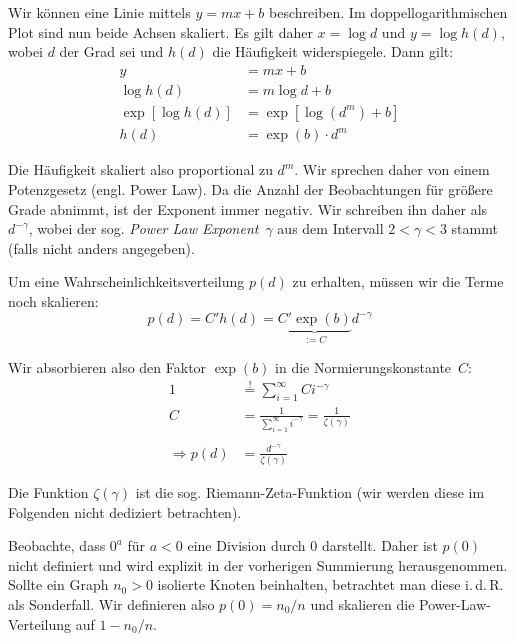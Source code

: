 Wir können eine Linie mittels $y = mx + b$ beschreiben.
Im doppellogarithmischen Plot sind nun beide Achsen skaliert.
Es gilt daher $x = \log d$ und $y = \log h(d)$, wobei $d$ der Grad sei und $h(d)$ die Häufigkeit widerspiegele.
Dann gilt:
\begin{align}
    y               & = mx + b              \\
    \log h(d)       & = m\log d + b         \\
    \exp[\log h(d)] & = \exp[\log(d^m) + b] \\
    h(d)            & = \exp(b) \cdot d^m
\end{align}

Die Häufigkeit skaliert also proportional zu $d^m$.
Wir  sprechen daher von einem Potenzgesetz (engl. Power Law).
Da die Anzahl der Beobachtungen für größere Grade abnimmt, ist der Exponent immer negativ.
Wir schreiben ihn daher als $d^{-\gamma}$, wobei der sog. \emph{Power Law Exponent}~$\gamma$ aus dem Intervall $2 < \gamma < 3$ stammt (falls nicht anders angegeben).

Um eine Wahrscheinlichkeitsverteilung $p(d)$ zu erhalten, müssen wir die Terme noch skalieren:
\begin{equation}
    p(d) = C' h(d) = \underbrace{C'\exp(b)}_{:= C} d^{-\gamma}
\end{equation}

\noindent
Wir absorbieren also den Faktor $\exp(b)$ in die Normierungskonstante~$C$:
\begin{align}
    1                & \stackrel{!}{=} \sum_{i=1}^\infty C i^{-\gamma}                          \\
    C                & = \frac{1}{\sum_{i=1}^\infty i^{-\gamma}}      = \frac{1}{\zeta(\gamma)} \\
    \nonumber                                                                                   \\
    \Rightarrow p(d) & = \frac{d^{-\gamma}}{\zeta(\gamma)}
\end{align}

Die Funktion $\zeta(\gamma)$ ist die sog. Riemann-Zeta-Funktion (wir werden diese im Folgenden nicht dediziert betrachten).

Beobachte, dass $0^a$ für $a < 0$ eine Division durch $0$ darstellt.
Daher ist $p(0)$ nicht definiert und wird explizit in der vorherigen Summierung herausgenommen.
Sollte ein Graph $n_0>0$ isolierte Knoten beinhalten, betrachtet man diese i.\,d.\,R. als Sonderfall.
Wir definieren also $p(0) = n_0 / n$ und skalieren die Power-Law-Verteilung auf $1  - n_0 /n$.

